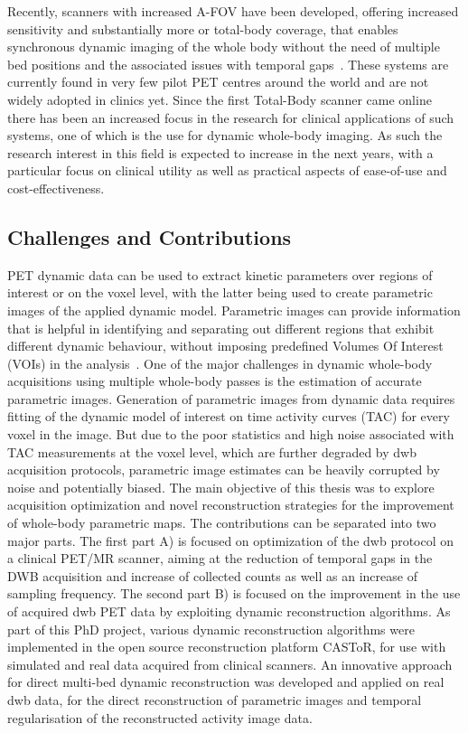 Recently, scanners with increased A-FOV have been developed, offering increased sensitivity and substantially more or total-body coverage, that enables synchronous dynamic imaging of the whole body without the need of multiple bed positions and the associated issues with temporal gaps~\cite{Karp2020,Siegel2020, Cherry2018}.
These systems are currently found in very few pilot PET centres around the world and are not widely adopted in clinics yet. Since the first Total-Body scanner came online there has been an increased focus in the research for clinical applications of such systems, one of which is the use for dynamic whole-body imaging. As such the research interest in this field is expected to increase in the next years, with a particular focus on clinical utility as well as practical aspects of ease-of-use and cost-effectiveness.

\subsection*{Challenges and Contributions}
PET dynamic data can be used to extract kinetic parameters over regions of interest or on the voxel level, with the latter being used to create parametric images of the applied dynamic model.
Parametric images can provide information that is helpful in identifying and separating out different regions that exhibit different dynamic behaviour, without imposing predefined Volumes Of Interest (VOIs) in the analysis~\cite{Gallezot2019}.  
One of the major challenges in dynamic whole-body acquisitions using multiple whole-body passes is the estimation of accurate parametric images. Generation of parametric images from dynamic data requires fitting of the dynamic model of interest on time activity curves (TAC) for every voxel in the image. But due to the poor statistics and high noise associated with TAC measurements at the voxel level, which are further degraded by \gls{dwb} acquisition protocols, parametric image estimates can be heavily corrupted by noise and potentially biased. 
The main objective of this thesis was to explore acquisition optimization and novel reconstruction strategies for the improvement of whole-body parametric maps. 
The contributions can be separated into two major parts. The first part A) is focused on optimization of the \gls{dwb} protocol on a clinical PET/MR scanner, aiming at the reduction of temporal gaps in the DWB acquisition and increase of collected counts as well as an increase of sampling frequency. The second part B) is focused on the improvement in the use of acquired \gls{dwb} PET data by exploiting dynamic reconstruction algorithms. As part of this PhD project, various dynamic reconstruction algorithms were implemented in the open source reconstruction platform CASToR, for use with simulated and real data acquired from clinical scanners. An innovative approach for direct multi-bed dynamic reconstruction was developed and applied on real \gls{dwb} data, for the direct reconstruction of parametric images and temporal regularisation of the reconstructed activity image data.

